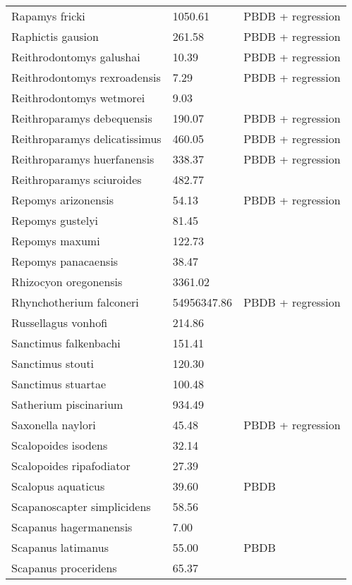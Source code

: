 \begin{center}
\begin{longtable}{p{} p{} p{} }
  Rapamys fricki & 1050.61 & PBDB + regression \\ 
  Raphictis gausion & 261.58 & PBDB + regression \\ 
  Reithrodontomys galushai & 10.39 & PBDB + regression \\ 
  Reithrodontomys rexroadensis & 7.29 & PBDB + regression \\ 
  Reithrodontomys wetmorei & 9.03 & \cite{Tomiya2013} \\ 
  Reithroparamys debequensis & 190.07 & PBDB + regression \\ 
  Reithroparamys delicatissimus & 460.05 & PBDB + regression \\ 
  Reithroparamys huerfanensis & 338.37 & PBDB + regression \\ 
  Reithroparamys sciuroides & 482.77 & \cite{Wang1994a} \\ 
  Repomys arizonensis & 54.13 & PBDB + regression \\ 
  Repomys gustelyi & 81.45 & \cite{Tomiya2013} \\ 
  Repomys maxumi & 122.73 & \cite{Tomiya2013} \\ 
  Repomys panacaensis & 38.47 & \cite{Tomiya2013} \\ 
  Rhizocyon oregonensis & 3361.02 & \cite{Tomiya2013} \\ 
  Rhynchotherium falconeri & 54956347.86 & PBDB + regression \\ 
  Russellagus vonhofi & 214.86 & \cite{Tomiya2013} \\ 
  Sanctimus falkenbachi & 151.41 & \cite{Tomiya2013} \\ 
  Sanctimus stouti & 120.30 & \cite{Tomiya2013} \\ 
  Sanctimus stuartae & 100.48 & \cite{Tomiya2013} \\ 
  Satherium piscinarium & 934.49 & \cite{Tomiya2013} \\ 
  Saxonella naylori & 45.48 & PBDB + regression \\ 
  Scalopoides isodens & 32.14 & \cite{Tomiya2013} \\ 
  Scalopoides ripafodiator & 27.39 & \cite{Tomiya2013} \\ 
  Scalopus aquaticus & 39.60 & PBDB \\ 
  Scapanoscapter simplicidens & 58.56 & \cite{Tomiya2013} \\ 
  Scapanus hagermanensis & 7.00 & \cite{McKenna2011} \\ 
  Scapanus latimanus & 55.00 & PBDB \\ 
  Scapanus proceridens & 65.37 & \cite{Tomiya2013} \\ 

\end{longtable}
\end{center}
